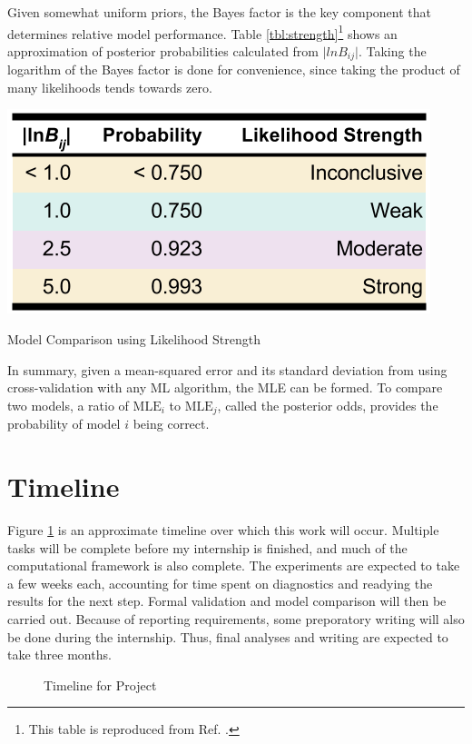 Given somewhat uniform priors, the Bayes factor is the key component that
determines relative model performance. Table \ref{tbl:strength}\footnote{This
table is reproduced from Ref. \cite{bayes_compare}.} shows an approximation of
posterior probabilities calculated from $\lvert lnB_{ij} \rvert$. Taking the
logarithm of the Bayes factor is done for convenience, since taking the product
of many likelihoods tends towards zero.

\begin{table}[!hbt]
  \centering
  \includegraphics[width=0.7\linewidth]{./chapters/proposal/evidence-strength.png}
  \caption{Model Comparison using Likelihood Strength}
  \label{tbl:strength}
\end{table}

In summary, given a mean-squared error and its standard deviation from using
cross-validation with any \gls{ML} algorithm, the \gls{MLE} can be formed. To
compare two models, a ratio of $\text{MLE}_i$ to $\text{MLE}_j$, called the
posterior odds, provides the probability of model $i$ being correct.

\section{Timeline}
\label{sec:timeline}

Figure \ref{fig:time} is an approximate timeline over which this work will
occur.  Multiple tasks will be complete before my internship is finished, and
much of the computational framework is also complete. The experiments are
expected to take a few weeks each, accounting for time spent on diagnostics and
readying the results for the next step. Formal validation and model comparison
will then be carried out. Because of reporting requirements, some preporatory
writing will also be done during the internship. Thus, final analyses and
writing are expected to take three months. 

\begin{figure}[!htb]
  \caption{Timeline for Project}
  \label{fig:time}
\end{figure}


